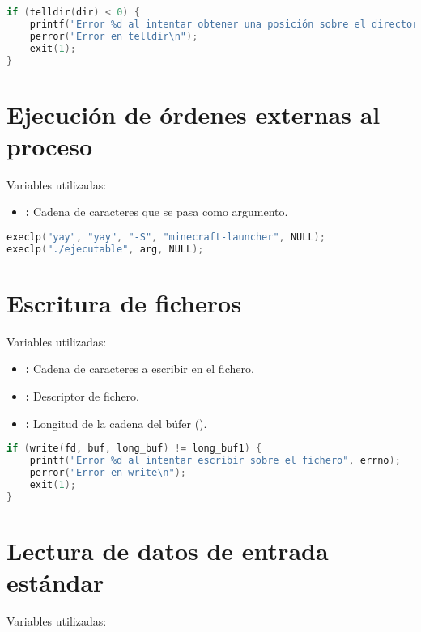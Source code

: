 \begin{lstlisting}[language=C]
if (telldir(dir) < 0) {
	printf("Error %d al intentar obtener una posición sobre el directorio", errno);
	perror("Error en telldir\n");
	exit(1);
}
\end{lstlisting}

\pagebreak

\section{Ejecución de órdenes externas al proceso}

Variables utilizadas:

\begin{itemize}
	\item{}\textbf{:} Cadena de caracteres que se pasa como argumento.
\end{itemize}

\begin{lstlisting}[language=C]
execlp("yay", "yay", "-S", "minecraft-launcher", NULL);
execlp("./ejecutable", arg, NULL);
\end{lstlisting}

\section{Escritura de ficheros}

Variables utilizadas:

\begin{itemize}
	\item{}\textbf{:} Cadena de caracteres a escribir en el fichero.
	\item{}\textbf{:} Descriptor de fichero.
	\item{}\textbf{:} Longitud de la cadena del  búfer ().
\end{itemize}

\begin{lstlisting}[language=C]
if (write(fd, buf, long_buf) != long_buf1) {
	printf("Error %d al intentar escribir sobre el fichero", errno);
	perror("Error en write\n");
	exit(1);
}
\end{lstlisting}

\section{Lectura de datos de entrada estándar}

Variables utilizadas:

